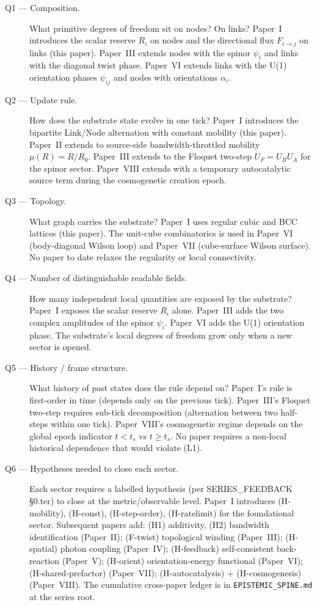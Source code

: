 \documentclass[11pt,a4paper]{article}
\begin{document}
\begin{description}
\item[Q1 --- Composition.] What primitive degrees of freedom
sit on nodes? On links? Paper~I introduces the scalar reserve
$R_i$ on nodes and the directional flux $F_{i\to j}$ on links
(this paper). Paper~III extends nodes with the spinor $\psi_i$
and links with the diagonal twist phase. Paper~VI extends
links with the U(1) orientation phases $\psi_{ij}$ and nodes
with orientations $\alpha_i$.

\item[Q2 --- Update rule.] How does the substrate state
evolve in one tick? Paper~I introduces the bipartite Link/Node
alternation with constant mobility (this paper). Paper~II
extends to source-side bandwidth-throttled mobility
$\mu(R) = R/R_0$. Paper~III extends to the Floquet two-step
$U_F = U_B U_A$ for the spinor sector. Paper~VIII extends with
a temporary autocatalytic source term during the cosmogenetic
creation epoch.

\item[Q3 --- Topology.] What graph carries the substrate?
Paper~I uses regular cubic and BCC lattices (this paper). The
unit-cube combinatorics is used in Paper~VI (body-diagonal
Wilson loop) and Paper~VII (cube-surface Wilson surface). No
paper to date relaxes the regularity or local connectivity.

\item[Q4 --- Number of distinguishable readable fields.]
How many independent local quantities are exposed by the
substrate? Paper~I exposes the scalar reserve $R_i$ alone.
Paper~III adds the two complex amplitudes of the spinor
$\psi_i$. Paper~VI adds the U(1) orientation phase. The
substrate's local degrees of freedom grow only when a new
sector is opened.

\item[Q5 --- History / frame structure.] What history of past
states does the rule depend on? Paper~I's rule is first-order
in time (depends only on the previous tick). Paper~III's
Floquet two-step requires sub-tick decomposition (alternation
between two half-steps within one tick). Paper~VIII's
cosmogenetic regime depends on the global epoch indicator
$t < t_s$ vs $t \ge t_s$. No paper requires a non-local
historical dependence that would violate (L1).

\item[Q6 --- Hypotheses needed to close each sector.] Each
sector requires a labelled hypothesis (per
SERIES\_FEEDBACK §0.ter) to close at the metric/observable
level. Paper~I introduces (H-mobility), (H-const),
(H-step-order), (H-ratelimit) for the foundational sector.
Subsequent papers add: (H1) additivity, (H2) bandwidth
identification (Paper~II); (F-twist) topological winding
(Paper~III); (H-spatial) photon coupling (Paper~IV);
(H-feedback) self-consistent back-reaction (Paper~V);
(H-orient) orientation-energy functional (Paper~VI);
(H-shared-prefactor) (Paper~VII); (H-autocatalysis) +
(H-cosmogenesis) (Paper~VIII). The cumulative cross-paper
ledger is in \texttt{EPISTEMIC\_SPINE.md} at the series root.
\end{description}
\end{document}
